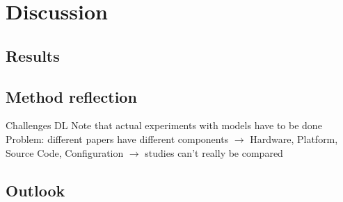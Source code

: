 \chapter{Discussion}\label{ch:discussion}
\section{Results}
\section{Method reflection}

Challenges DL\cite{arpteg_software_2018}
Note that actual experiments with models have to be done
Problem: different papers have different components
$\rightarrow$ Hardware, Platform, Source Code, Configuration
$\rightarrow$ studies can't really be compared
\section{Outlook}
